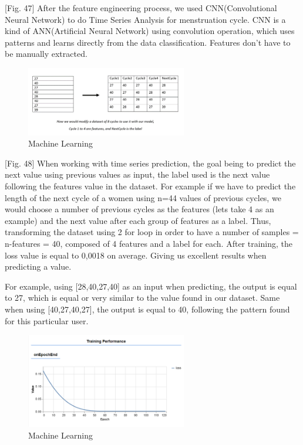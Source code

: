 \documentclass[conference]{IEEEtran}
\begin{document}
\begin{itemize}
\begin{enumerate}
\begin{enumerate}
\begin{itemize}
                \setlength{\parindent}{2ex} [Fig. 47] After the feature engineering process, we used CNN(Convolutional Neural Network) to do Time Series Analysis for menstruation cycle. CNN is a kind of ANN(Artificial Neural Network) using convolution operation, which uses patterns and learns directly from the data classification. Features don't have to be manually extracted. 
                 \begin{figure}[ht]
                 \includegraphics[width=7cm, center]{machineclass2.png}
                 \caption{Machine Learning}
                 \label{fig48}
                 \end{figure}        
                 
                \setlength{\parindent}{2ex} [Fig. 48] When working with time series prediction, the goal being to predict the next value using previous values as input, the label used is the next value following the features value in the dataset. For example if we have to predict the length of the next cycle of a women using n=44 values of previous cycles, we would choose a number of previous cycles as the features (lets take 4 as an example) and the next value after each group of features as a label. Thus, transforming the dataset using 2 for loop in order to have a number of samples = n-features = 40, composed of 4 features and a label for each. After training, the loss value is equal to 0,0018 on average. Giving us excellent results when predicting a value.
                
                \setlength{\parindent}{2ex} For example, using [28,40,27,40] as an input when predicting, the output is equal to 27, which is equal or very similar to the value found in our dataset. Same when using [40,27,40,27], the output is equal to 40, following the pattern found for this particular user.
                 \begin{figure}[ht]
                 \includegraphics[width=7cm, center]{machineclass3.png}
                 \caption{Machine Learning}
                 \label{fig49}
                 \end{figure}  
                 

\end{itemize}
\end{enumerate}
\end{enumerate}
\end{itemize}
\end{document}
